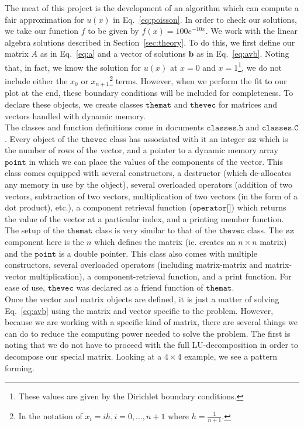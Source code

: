 \documentclass[12pt]{article}
\numberwithin{equation}{section}
\begin{document}
The meat of this project is the development of an algorithm which can compute a fair approximation for $u\left(x\right)$ in Eq.~\ref{eq:poisson}.  In order to check our solutions, we take our function $f$ to be given by $f\left(x\right) = 100e^{-10x}$.  We work with the linear algebra solutions described in Section~\ref{sec:theory}.  To do this, we first define our matrix $A$ as in Eq.~\ref{eq:a} and a vector of solutions $\textbf{b}$ as in Eq.~\ref{eq:avb}.  Noting that, in fact, we know the solution for $u\left(x\right)$ at $x=0$ and $x=1$\footnote{These values are given by the Dirichlet boundary conditions.}, we do not include either the $x_{0}$ or $x_{n+1}$\footnote{In the notation of $x_{i}=ih,i=0,\ldots,n+1$ where $h=\frac{1}{n+1}$.} terms.  However, when we perform the fit to our plot at the end, these boundary conditions will be included for completeness.  To declare these objects, we create classes $\texttt{themat}$ and $\texttt{thevec}$ for matrices and vectors handled with dynamic memory. 
\\\indent The classes and function definitions come in documents $\texttt{classes.h}$ and $\texttt{classes.C}$.  Every object of the $\texttt{thevec}$ class has associated with it an integer $\texttt{sz}$ which is the number of rows of the vector, and a pointer to a dynamic memory array $\texttt{point}$ in which we can place the values of the components of the vector.  This class comes equipped with several constructors, a destructor (which de-allocates any memory in use by the object), several overloaded operators (addition of two vectors, subtraction of two vectors, multiplication of two vectors (in the form of a dot product), etc.), a component retrieval function ($\texttt{operator[]}$) which returns the value of the vector at a particular index, and a printing member function.  
\\\indent The setup of the $\texttt{themat}$ class is very similar to that of the $\texttt{thevec}$ class.  The $\texttt{sz}$ component here is the $n$ which defines the matrix (ie. creates an $n\times n$ matrix) and the $\texttt{point}$ is a double pointer.  This class also comes with multiple constructors, several overloaded operators (including matrix-matrix and matrix-vector multiplication), a component-retrieval function, and a print function.  For ease of use, $\texttt{thevec}$ was declared as a friend function of $\texttt{themat}$.  
\\\indent Once the vector and matrix objects are defined, it is just a matter of solving Eq.~\ref{eq:avb} using the matrix and vector specific to the problem.  However, because we are working with a specific kind of matrix, there are several things we can do to reduce the computing power needed to solve the problem.  The first is noting that we do not have to proceed with the full LU-decomposition in order to decompose our special matrix.  Looking at a $4\times4$ example, we see a pattern forming. 
\end{document}
